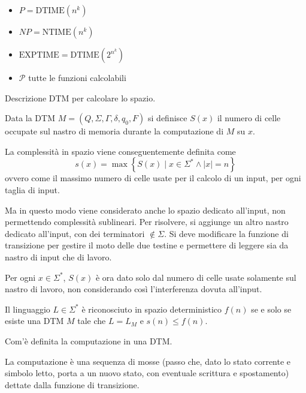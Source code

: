 \documentclass[12pt, answers]{exam}
\theoremstyle{plain}
\newcommand{\dtime}{\text{DTIME}}
\newcommand{\exptime}{\text{EXPTIME}}
\newcommand{\ntime}{\text{NTIME}}
\newcommand{\cp}{\mathcal{P}}
\begin{document}
\begin{questions}
\begin{solution}
\begin{itemize}
                \item $P = \dtime \left(n^k \right)$
                
                \item $NP = \ntime \left(n^k \right)$
                
                \item $\exptime = \dtime \left(2^{n^k}\right)$
                
                \item $\cp$ tutte le funzioni calcolabili
            \end{itemize}
        \end{solution}
        
        \question Descrizione DTM per calcolare lo spazio.
        
        \begin{solution}
            Data la DTM $M = (Q, \Sigma, \Gamma, \delta, q_0, F)$ si definisce $S(x)$ il numero di celle occupate sul nastro di memoria durante la computazione di $M$ su $x$. 
            
            La complessità in spazio viene conseguentemente definita come
            $$ s(x) = \max \left\{S (x) \mid x \in \Sigma^\ast \wedge |x| = n\right\}$$ 
            ovvero come il massimo numero di celle usate per il calcolo di un input, per ogni taglia di input.
            
            Ma in questo modo viene considerato anche lo spazio dedicato all'input, non permettendo complessità sublineari. Per risolvere, si aggiunge un altro nastro dedicato all'input, con dei terminatori $\notin \Sigma$. Si deve modificare la funzione di transizione per gestire il moto delle due testine e permettere di leggere sia da nastro di input che di lavoro.
            
            Per ogni $x \in \Sigma^\ast$, $S(x)$ è ora dato solo dal numero di celle usate solamente sul nastro di lavoro, non considerando così l'interferenza dovuta all'input.
            
            Il linguaggio $L \in \Sigma^\ast$ è riconosciuto in spazio deterministico $f(n)$ se e solo se esiste una DTM $M$ tale che $L = L_M$ e $s(n) \leq f(n)$.
        \end{solution}
        
        \question Com'è definita la computazione in una DTM.
        
        \begin{solution}
            La computazione è una sequenza di mosse (passo che, dato lo stato corrente e simbolo letto, porta a un nuovo stato, con eventuale scrittura e spostamento) dettate dalla funzione di transizione. 
            

\end{solution}
\end{questions}
\end{document}
